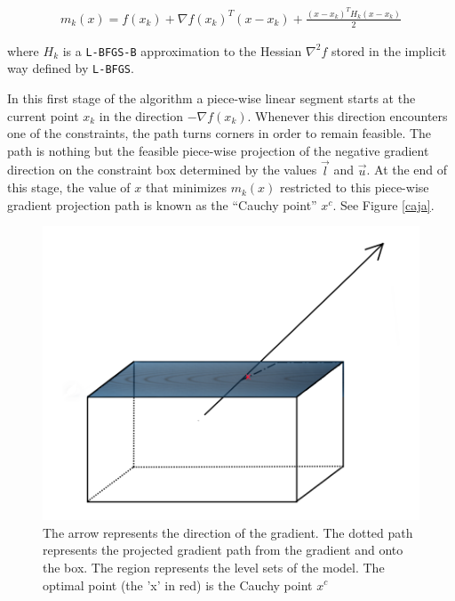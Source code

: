 \begin{equation} \label{themodel}
  \begin{aligned}
    m_k(x) = f(x_k) + \nabla f(x_k)^T ( x - x_k) + \frac{(x - x_k)^T H_k (x - x_k) }{2}
  \end{aligned}
\end{equation}

where $H_k$ is a \texttt{L-BFGS-B} approximation to the Hessian $\nabla^2 f$ stored in the implicit way defined by \texttt{L-BFGS}.

In this first stage of the algorithm a piece-wise linear segment starts at the current point $x_k$ in the direction $-\nabla f(x_k)$. Whenever this direction encounters one of the constraints, the path turns corners in order to remain feasible. The path is nothing but the feasible piece-wise projection of the negative gradient direction on the constraint box determined by the values $\overrightarrow{l}$ and $\overrightarrow{u}$. At the end of this stage, the value of $x$ that minimizes $m_k(x)$ restricted to this piece-wise gradient projection path is known as the ``Cauchy point'' $x^c$. See Figure \eqref{caja}.

\begin{figure}
\begin{center}
\includegraphics[scale=0.4]{Figures/cajapresentation2.png}
\caption[Graphical Representation of Gradient Projection]{The arrow represents the direction of the gradient. The dotted path represents the projected gradient path from the gradient and onto the box. The region represents the level sets of the model. The optimal point (the 'x' in red) is the Cauchy point $x^c$}
\label{caja}
\end{center}
\end{figure}


